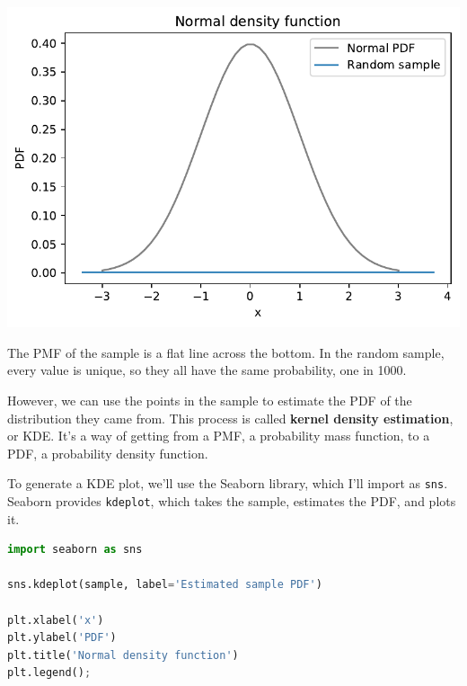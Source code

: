 \begin{center}
\includegraphics[scale=0.75]{chapters/08_distributions_files/08_distributions_123_0.pdf}
\end{center}

The PMF of the sample is a flat line across the bottom. In the random
sample, every value is unique, so they all have the same probability,
one in 1000.

However, we can use the points in the sample to estimate the PDF of the
distribution they came from. This process is called \textbf{kernel
density estimation}, or KDE. It's a way of getting from a PMF, a
probability mass function, to a PDF, a probability density function.

To generate a KDE plot, we'll use the Seaborn library, which I'll import
as \passthrough{\lstinline!sns!}. Seaborn provides
\passthrough{\lstinline!kdeplot!}, which takes the sample, estimates the
PDF, and plots it.

\begin{lstlisting}[language=Python]
import seaborn as sns

sns.kdeplot(sample, label='Estimated sample PDF')

plt.xlabel('x')
plt.ylabel('PDF')
plt.title('Normal density function')
plt.legend();
\end{lstlisting}

